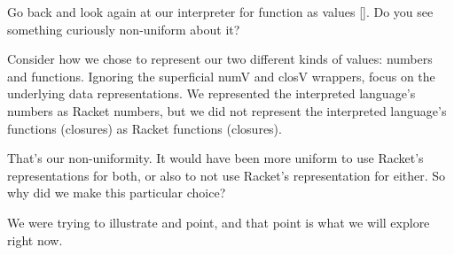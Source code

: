 \secdown

Go back and look again at our interpreter for function as values \ref{}. Do you
see something curiously non-uniform about it?


Consider how we chose to represent our two different kinds of values: numbers
and functions. Ignoring the superficial numV and closV wrappers, focus on the
underlying data representations. We represented the interpreted language’s
numbers as Racket numbers, but we did not represent the interpreted language’s
functions (closures) as Racket functions (closures).

That’s our non-uniformity. It would have been more uniform to use Racket’s
representations for both, or also to not use Racket’s representation for either.
So why did we make this particular choice?

We were trying to illustrate and point, and that point is what we will explore
right now.





\secup
